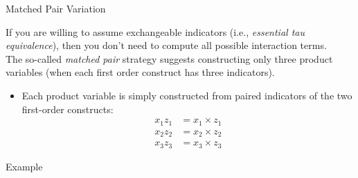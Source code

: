 \documentclass{beamer}
\newcommand{\va}[0]{\vspace{12pt}}
\begin{document}
\begin{frame}{Matched Pair Variation}
  
  If you are willing to assume exchangeable indicators (i.e.,
  \emph{essential tau equivalence}), then you don't need to compute
  all possible interaction terms.\\ 
  \va 
  The so-called \emph{matched pair} strategy suggests constructing only 
  three product variables (when each first order construct has three indicators).
  \va
  \begin{itemize}
    \item Each product variable is simply constructed from paired
      indicators of the two first-order constructs:
      \begin{align*}
        x_1z_1 &= x_1 \times z_1\\
        x_2z_2 &= x_2 \times z_2\\
        x_3z_3 &= x_3 \times z_3
      \end{align*}
  \end{itemize}   

\end{frame}
  


\begin{frame}[allowframebreaks]{Example}
  


\pagebreak



\end{frame}
\end{document}
